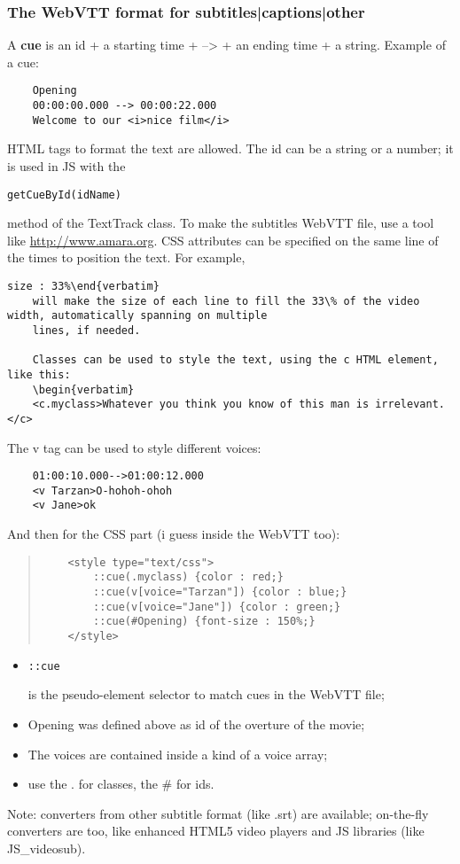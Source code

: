 \documentclass[a4paper,11pt]{book}
\begin{document}
	\subsubsection{The WebVTT format for subtitles|captions|other}
	A \textbf{cue} is an id + a starting time + --> + an ending time + a string. Example of a cue:
	\begin{verbatim}
	Opening
	00:00:00.000 --> 00:00:22.000
	Welcome to our <i>nice film</i>
	\end{verbatim}
	HTML tags to format the text are allowed. The id can be a string or a number; it is used in JS with the
	\begin{verbatim}getCueById(idName)\end{verbatim} method of the TextTrack class.
	To make the subtitles WebVTT file, use a tool like \url{http://www.amara.org}.
	CSS attributes can be specified on the same line of the times to position the text. For example,
	\begin{verbatim}size : 33%\end{verbatim}
	will make the size of each line to fill the 33\% of the video width, automatically spanning on multiple
	lines, if needed.
	
	Classes can be used to style the text, using the c HTML element, like this:
	\begin{verbatim}
	<c.myclass>Whatever you think you know of this man is irrelevant.</c>
	\end{verbatim}
	The v tag can be used to style different voices:
	\begin{verbatim}
	01:00:10.000-->01:00:12.000
	<v Tarzan>O-hohoh-ohoh
	<v Jane>ok
	\end{verbatim}
	And then for the CSS part (i guess inside the WebVTT too):
	\begin{verse}
	\begin{verbatim}
	<style type="text/css">
		::cue(.myclass) {color : red;}
		::cue(v[voice="Tarzan"]) {color : blue;}
		::cue(v[voice="Jane"]) {color : green;}
		::cue(#Opening) {font-size : 150%;}
	</style>
	\end{verbatim}
	\end{verse}
	\begin{itemize}
	\item \begin{verbatim}::cue\end{verbatim} is the pseudo-element selector to match cues in the WebVTT file;
	\item Opening was defined above as id of the overture of the movie;
	\item The voices are contained inside a kind of a voice array;
	\item use the . for classes, the \# for ids.
	\end{itemize}
	Note: converters from other subtitle format (like .srt) are available; on-the-fly converters are too, like
	enhanced HTML5 video players and JS libraries (like JS\_videosub).
	
\end{document}
